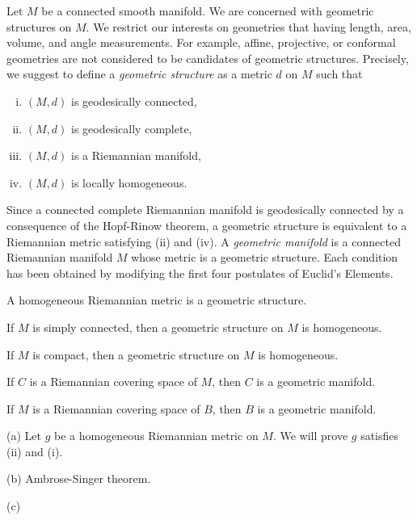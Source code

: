 \documentclass{../note}
\begin{document}
\begin{prb}
Let $M$ be a connected smooth manifold.
We are concerned with geometric structures on $M$.
We restrict our interests on geometries that having length, area, volume, and angle measurements.
For example, affine, projective, or conformal geometries are not considered to be candidates of geometric structures.
Precisely, we suggest to define a \emph{geometric structure} as a metric $d$ on $M$ such that
\begin{enumerate}[(i)]
\item $(M,d)$ is geodesically connected,
\item $(M,d)$ is geodesically complete,
\item $(M,d)$ is a Riemannian manifold,
\item $(M,d)$ is locally homogeneous.
\end{enumerate}
Since a connected complete Riemannian manifold is geodesically connected by a consequence of the Hopf-Rinow theorem, a geometric structure is equivalent to a Riemannian metric satisfying (ii) and (iv).
A \emph{geometric manifold} is a connected Riemannian manifold $M$ whose metric is a geometric structure.
Each condition has been obtained by modifying the first four postulates of Euclid's Elements.
\begin{parts}
\item A homogeneous Riemannian metric is a geometric structure.
\item If $M$ is simply connected, then a geometric structure on $M$ is homogeneous.
\item If $M$ is compact, then a geometric structure on $M$ is homogeneous.
\item If $C$ is a Riemannian covering space of $M$, then $C$ is a geometric manifold.
\item If $M$ is a Riemannian covering space of $B$, then $B$ is a geometric manifold.
\end{parts}
\end{prb}
\begin{pf}
(a)
Let $g$ be a homogeneous Riemannian metric on $M$.
We will prove $g$ satisfies (ii) and (i).

(b) %
Ambrose-Singer theorem.

(c)
\end{pf}
\end{document}
